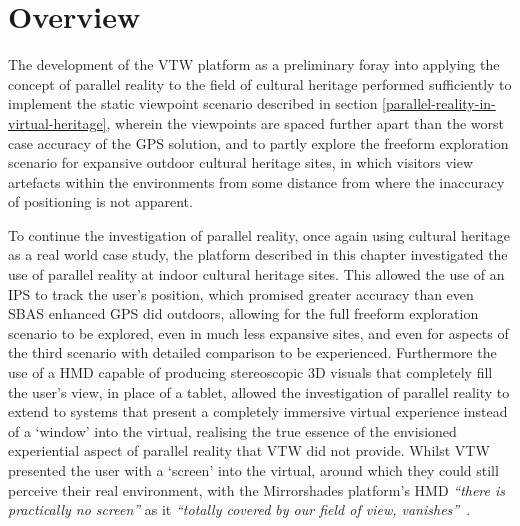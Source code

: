 



\section{Overview}
The development of the VTW platform as a preliminary foray into applying the concept of parallel reality to the field of cultural heritage performed sufficiently to implement the static viewpoint scenario described in section \ref{parallel-reality-in-virtual-heritage}, wherein the viewpoints are spaced further apart than the worst case accuracy of the GPS solution, and to partly explore the freeform exploration scenario for expansive outdoor cultural heritage sites, in which visitors view artefacts within the environments from some distance from where the inaccuracy of positioning is not apparent.

To continue the investigation of parallel reality, once again using cultural heritage as a real world case study, the platform described in this chapter investigated the use of parallel reality at indoor cultural heritage sites. This allowed the use of an IPS to track the user's position, which promised greater accuracy than even SBAS enhanced GPS did outdoors, allowing for the full freeform exploration scenario to be explored, even in much less expansive sites, and even for aspects of the third scenario with detailed comparison to be experienced. Furthermore the use of a HMD capable of producing stereoscopic 3D visuals that completely fill the user's view, in place of a tablet, allowed the investigation of parallel reality to extend to systems that present a completely immersive virtual experience instead of a `window' into the virtual, realising the true essence of the envisioned experiential aspect of parallel reality that VTW did not provide. Whilst VTW presented the user with a `screen' into the virtual, around which they could still perceive their real environment, with the Mirrorshades platform's HMD \textit{``there is practically no screen''} as it \textit{``totally covered by our field of view, vanishes''}~\cite{Tzortzaki2002}.

